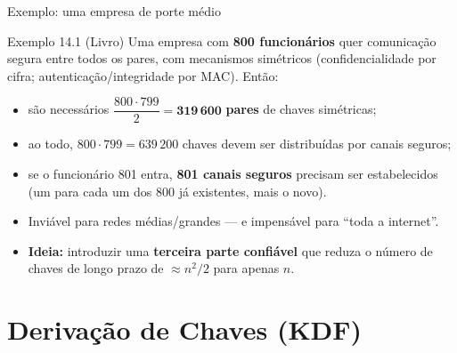 \documentclass{beamer}
\begin{document}
\begin{frame}{Exemplo: uma empresa de porte médio}
    \begin{exampleblock}{Exemplo 14.1 (Livro)}
        \footnotesize
        Uma empresa com \textbf{800 funcionários} quer comunicação segura entre todos os pares, com mecanismos simétricos (confidencialidade por cifra; autenticação/integridade por MAC). Então:
        \begin{itemize}
            \item são necessários $\dfrac{800 \cdot 799}{2} = \mathbf{319\,600}$ \textbf{pares} de chaves simétricas;
            \item ao todo, $800 \cdot 799 = 639\,200$ chaves devem ser distribuídas por canais seguros;
            \item se o funcionário 801 entra, \textbf{801 canais seguros} precisam ser estabelecidos (um para cada um dos 800 já existentes, mais o novo).
        \end{itemize}
    \end{exampleblock}
    \medskip
    \begin{itemize}
        \footnotesize
        \item Inviável para redes médias/grandes --- e impensável para ``toda a internet''.
        \item \textbf{Ideia:} introduzir uma \textbf{terceira parte confiável} que reduza o número de chaves de longo prazo de $\approx n^2/2$ para apenas $n$.
    \end{itemize}
\end{frame}

\section{Derivação de Chaves (KDF)}
\end{document}
